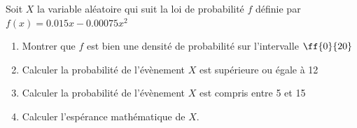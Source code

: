 \begin{exercice_cours}

Soit $X$ la variable aléatoire qui suit la loi de probabilité $f$ définie par $f(x)=0.015x-0.00075x^2$

\begin{enumerate}
	\item Montrer que $f$ est bien une densité de probabilité sur l'intervalle $\ff{0}{20}$
	
\begin{blocvisiblex}[height=2.]
{\quad}
\end{blocvisiblex}
	\item Calculer la probabilité de l'évènement \og $X$ est supérieure ou égale à 12 \fg{} 
	

\begin{blocvisiblex}[height=2.]
{\quad}
\end{blocvisiblex}	
	\item Calculer la probabilité de l'évènement \og $X$ est compris entre 5 et 15 \fg{} 
	

\begin{blocvisiblex}[height=2.]
{\quad}
\end{blocvisiblex}
\item Calculer l'espérance mathématique de $X$.


\begin{blocvisiblex}[height=2.]
{\quad}
\end{blocvisiblex}\end{enumerate}


\end{exercice_cours}